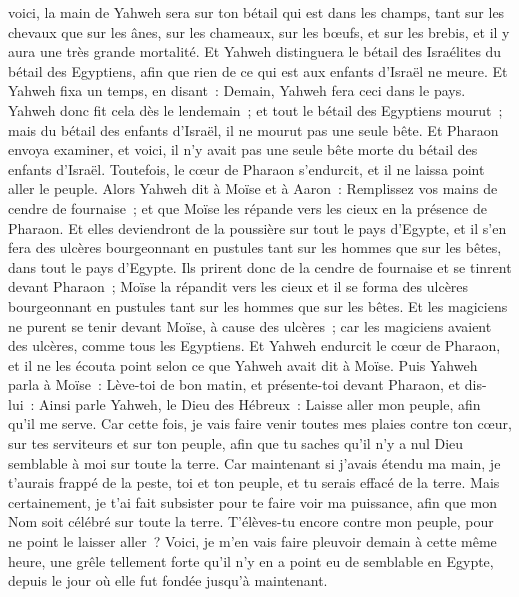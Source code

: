 \begin{multicols}{2}
voici, la main de Yahweh sera sur ton bétail qui est dans les champs, tant sur les chevaux que sur les ânes, sur les chameaux, sur les bœufs, et sur les brebis, et il y aura une très grande mortalité.
Et Yahweh distinguera le bétail des Israélites du bétail des Egyptiens, afin que rien de ce qui est aux enfants d'Israël ne meure.
Et Yahweh fixa un temps, en disant~: Demain, Yahweh fera ceci dans le pays.
Yahweh donc fit cela dès le lendemain~; et tout le bétail des Egyptiens mourut~; mais du bétail des enfants d'Israël, il ne mourut pas une seule bête.
Et Pharaon envoya examiner, et voici, il n'y avait pas une seule bête morte du bétail des enfants d'Israël. Toutefois, le cœur de Pharaon s'endurcit, et il ne laissa point aller le peuple.
Alors Yahweh dit à Moïse et à Aaron~: Remplissez vos mains de cendre de fournaise~; et que Moïse les répande vers les cieux en la présence de Pharaon.
Et elles deviendront de la poussière sur tout le pays d'Egypte, et il s'en fera des ulcères bourgeonnant en pustules tant sur les hommes que sur les bêtes, dans tout le pays d'Egypte.
Ils prirent donc de la cendre de fournaise et se tinrent devant Pharaon~; Moïse la répandit vers les cieux et il se forma des ulcères bourgeonnant en pustules tant sur les hommes que sur les bêtes.
 Et les magiciens ne purent se tenir devant Moïse, à cause des ulcères~; car les magiciens avaient des ulcères, comme tous les Egyptiens.
 Et Yahweh endurcit le cœur de Pharaon, et il ne les écouta point selon ce que Yahweh avait dit à Moïse.
Puis Yahweh parla à Moïse~: Lève-toi de bon matin, et présente-toi devant Pharaon, et dis-lui~: Ainsi parle Yahweh, le Dieu des Hébreux~: Laisse aller mon peuple, afin qu'il me serve.
Car cette fois, je vais faire venir toutes mes plaies contre ton cœur, sur tes serviteurs et sur ton peuple, afin que tu saches qu'il n'y a nul Dieu semblable à moi sur toute la terre.
Car maintenant si j'avais étendu ma main, je t'aurais frappé de la peste, toi et ton peuple, et tu serais effacé de la terre.
Mais certainement, je t'ai fait subsister pour te faire voir ma puissance, afin que mon Nom soit célébré sur toute la terre.
T'élèves-tu encore contre mon peuple, pour ne point le laisser aller~?
Voici, je m'en vais faire pleuvoir demain à cette même heure, une grêle tellement forte qu'il n'y en a point eu de semblable en Egypte, depuis le jour où elle fut fondée jusqu'à maintenant.

\end{multicols}
